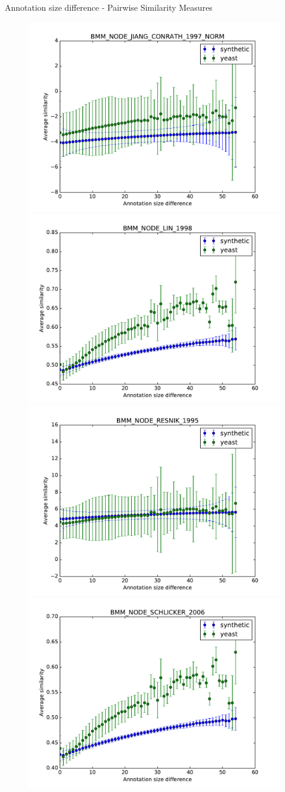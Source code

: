 \documentclass{beamer}
\begin{document}
\begin{frame}{Annotation size difference - Pairwise Similarity Measures}

\begin{figure}
\includegraphics[width=0.5\linewidth, height=0.4\textheight]{pairwise_diff/SIM_GROUPWISE_BMM_SIM_PAIRWISE_DAG_NODE_JIANG_CONRATH_1997_NORM_diff.pdf} 
\includegraphics[width=0.5\linewidth, height=0.4\textheight]{pairwise_diff/SIM_GROUPWISE_BMM_SIM_PAIRWISE_DAG_NODE_LIN_1998_diff.pdf}\\
\includegraphics[width=0.5\linewidth, height=0.4\textheight]{pairwise_diff/SIM_GROUPWISE_BMM_SIM_PAIRWISE_DAG_NODE_RESNIK_1995_diff.pdf}
\includegraphics[width=0.5\linewidth, height=0.4\textheight]{pairwise_diff/SIM_GROUPWISE_BMM_SIM_PAIRWISE_DAG_NODE_SCHLICKER_2006_diff.pdf}
\end{figure}

\end{frame}
\end{document}
